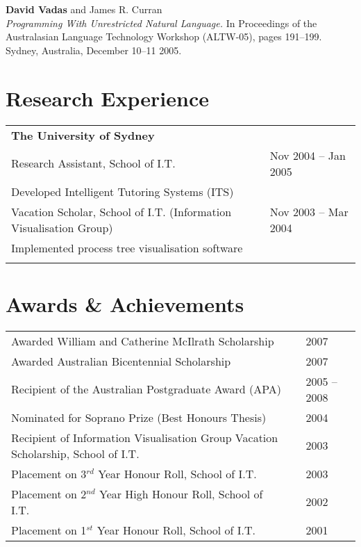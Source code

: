 \documentclass[]{article}
\begin{document}
\vbox{}

\textbf{David Vadas} and James R. Curran\\
\textit{Programming With Unrestricted Natural Language.} In Proceedings of the
Australasian Language Technology Workshop (ALTW-05), pages 191--199. 
Sydney, Australia, December 10--11 2005. \\  
 

\section*{Research Experience}
\setlength{\tabcolsep}{0.1cm}
\begin{table*}[h!]
\begin{tabular}[h!]{p{13.5cm}l}

\textbf{The University of Sydney} & \\
Research Assistant, School of I.T. & Nov 2004 -- Jan 2005 \\
\hspace{0.5cm}Developed Intelligent Tutoring Systems (ITS) & \\

Vacation Scholar, School of I.T. (Information Visualisation Group) & Nov 2003 -- Mar 2004 \\
\hspace{0.5cm}Implemented process tree visualisation software & \\
& \\

\end{tabular}
\end{table*}



\section*{Awards \& Achievements}
\begin{table*}[h!]
\begin{tabular}[h]{p{13.5cm}ll}

Awarded William and Catherine McIlrath Scholarship & & 2007 \\
Awarded Australian Bicentennial Scholarship & & 2007 \\
Recipient of the Australian Postgraduate Award (APA) & & 2005 -- 2008 \\
Nominated for Soprano Prize (Best Honours Thesis) & &2004\\
Recipient of Information Visualisation Group Vacation Scholarship, School of I.T. &  &2003 \\
Placement on 3$^{rd}$ Year Honour Roll, School of I.T. &  &2003 \\
Placement on 2$^{nd}$ Year High Honour Roll, School of I.T. &  &2002 \\
Placement on 1$^{st}$ Year Honour Roll, School of I.T. &  &2001 \\
\end{tabular}
\end{table*}
\end{document}
